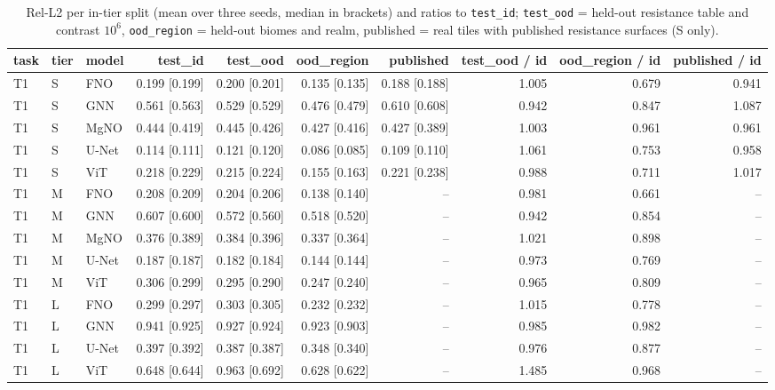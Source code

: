 \begin{table}[tb]
\centering
\scriptsize
\setlength{\tabcolsep}{3.5pt}
\caption{Rel-L2 per in-tier split (mean over three seeds, median in brackets) and ratios to \texttt{test\_id}; \texttt{test\_ood} = held-out resistance table and contrast $10^6$, \texttt{ood\_region} = held-out biomes and realm, published = real tiles with published resistance surfaces (S only).}
\label{tab:ood}
\setlength{\tabcolsep}{2.2pt}
\begin{tabular}{lllrrrrrrr}
\toprule
task & tier & model & test\_id & test\_ood & ood\_region & published & test\_ood / id & ood\_region / id & published / id \\
\midrule
T1 & S & FNO & 0.199 [0.199] & 0.200 [0.201] & 0.135 [0.135] & 0.188 [0.188] & 1.005 & 0.679 & 0.941 \\
T1 & S & GNN & 0.561 [0.563] & 0.529 [0.529] & 0.476 [0.479] & 0.610 [0.608] & 0.942 & 0.847 & 1.087 \\
T1 & S & MgNO & 0.444 [0.419] & 0.445 [0.426] & 0.427 [0.416] & 0.427 [0.389] & 1.003 & 0.961 & 0.961 \\
T1 & S & U-Net & 0.114 [0.111] & 0.121 [0.120] & 0.086 [0.085] & 0.109 [0.110] & 1.061 & 0.753 & 0.958 \\
T1 & S & ViT & 0.218 [0.229] & 0.215 [0.224] & 0.155 [0.163] & 0.221 [0.238] & 0.988 & 0.711 & 1.017 \\
T1 & M & FNO & 0.208 [0.209] & 0.204 [0.206] & 0.138 [0.140] & -- & 0.981 & 0.661 & -- \\
T1 & M & GNN & 0.607 [0.600] & 0.572 [0.560] & 0.518 [0.520] & -- & 0.942 & 0.854 & -- \\
T1 & M & MgNO & 0.376 [0.389] & 0.384 [0.396] & 0.337 [0.364] & -- & 1.021 & 0.898 & -- \\
T1 & M & U-Net & 0.187 [0.187] & 0.182 [0.184] & 0.144 [0.144] & -- & 0.973 & 0.769 & -- \\
T1 & M & ViT & 0.306 [0.299] & 0.295 [0.290] & 0.247 [0.240] & -- & 0.965 & 0.809 & -- \\
T1 & L & FNO & 0.299 [0.297] & 0.303 [0.305] & 0.232 [0.232] & -- & 1.015 & 0.778 & -- \\
T1 & L & GNN & 0.941 [0.925] & 0.927 [0.924] & 0.923 [0.903] & -- & 0.985 & 0.982 & -- \\
T1 & L & U-Net & 0.397 [0.392] & 0.387 [0.387] & 0.348 [0.340] & -- & 0.976 & 0.877 & -- \\
T1 & L & ViT & 0.648 [0.644] & 0.963 [0.692] & 0.628 [0.622] & -- & 1.485 & 0.968 & -- \\

\end{tabular}
\end{table}
